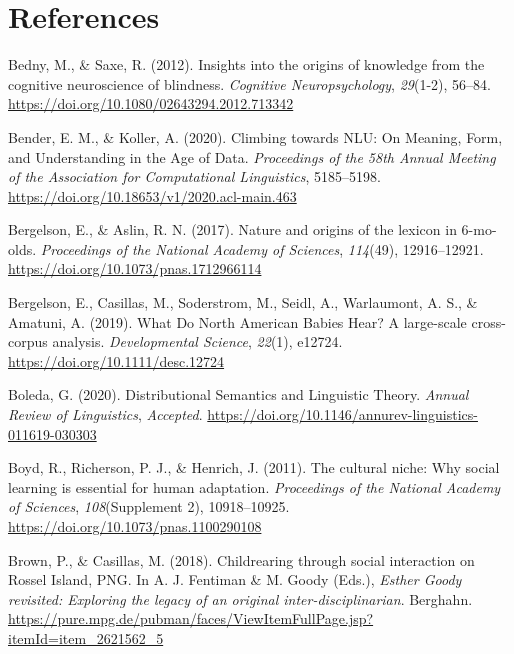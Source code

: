 \documentclass[11pt,man]{article}
\newlength{\cslhangindent}
\newenvironment{cslreferences}%
  {\setlength{\parindent}{0pt}%
  \everypar{\setlength{\hangindent}{\cslhangindent}}\ignorespaces}%
  {\par}
\begin{document}
\newpage

\hypertarget{references}{%
\section*{References}\label{references}}

\hypertarget{refs}{}
\begin{cslreferences}
\leavevmode\hypertarget{ref-bedny_insights_2012}{}%
Bedny, M., \& Saxe, R. (2012). Insights into the origins of knowledge
from the cognitive neuroscience of blindness. \emph{Cognitive
Neuropsychology}, \emph{29}(1-2), 56--84.
\url{https://doi.org/10.1080/02643294.2012.713342}

\leavevmode\hypertarget{ref-bender_climbing_2020}{}%
Bender, E. M., \& Koller, A. (2020). Climbing towards NLU: On Meaning,
Form, and Understanding in the Age of Data. \emph{Proceedings of the
58th Annual Meeting of the Association for Computational Linguistics},
5185--5198. \url{https://doi.org/10.18653/v1/2020.acl-main.463}

\leavevmode\hypertarget{ref-bergelson_nature_2017}{}%
Bergelson, E., \& Aslin, R. N. (2017). Nature and origins of the lexicon
in 6-mo-olds. \emph{Proceedings of the National Academy of Sciences},
\emph{114}(49), 12916--12921.
\url{https://doi.org/10.1073/pnas.1712966114}

\leavevmode\hypertarget{ref-bergelson_what_2019}{}%
Bergelson, E., Casillas, M., Soderstrom, M., Seidl, A., Warlaumont, A.
S., \& Amatuni, A. (2019). What Do North American Babies Hear? A
large-scale cross-corpus analysis. \emph{Developmental Science},
\emph{22}(1), e12724. \url{https://doi.org/10.1111/desc.12724}

\leavevmode\hypertarget{ref-boleda_distributional_2020}{}%
Boleda, G. (2020). Distributional Semantics and Linguistic Theory.
\emph{Annual Review of Linguistics}, \emph{Accepted}.
\url{https://doi.org/10.1146/annurev-linguistics-011619-030303}

\leavevmode\hypertarget{ref-boyd_cultural_2011}{}%
Boyd, R., Richerson, P. J., \& Henrich, J. (2011). The cultural niche:
Why social learning is essential for human adaptation. \emph{Proceedings
of the National Academy of Sciences}, \emph{108}(Supplement 2),
10918--10925. \url{https://doi.org/10.1073/pnas.1100290108}

\leavevmode\hypertarget{ref-brown_childrearing_2018}{}%
Brown, P., \& Casillas, M. (2018). Childrearing through social
interaction on Rossel Island, PNG. In A. J. Fentiman \& M. Goody (Eds.),
\emph{Esther Goody revisited: Exploring the legacy of an original
inter-disciplinarian}. Berghahn.
\url{https://pure.mpg.de/pubman/faces/ViewItemFullPage.jsp?itemId=item_2621562_5}


\end{cslreferences}
\end{document}
